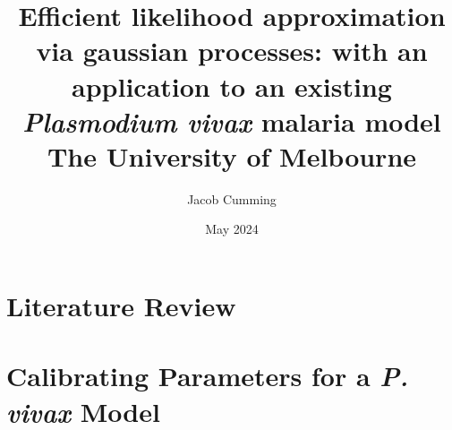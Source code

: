 \documentclass{book}
\begin{document}

\title{
{Efficient likelihood approximation via gaussian processes: 
with an application to an existing \emph{Plasmodium vivax} malaria model}\\
{\large The University of Melbourne}
}
\author{Jacob Cumming}


\date{May 2024}

\maketitle
{}
\tableofcontents

\listoftables
\listoffigures

% 
% 


\newpage


\part{Literature Review}



% 
% 


\part{Calibrating Parameters for a \emph{P. vivax} Model}



\printbibliography


\end{document}
